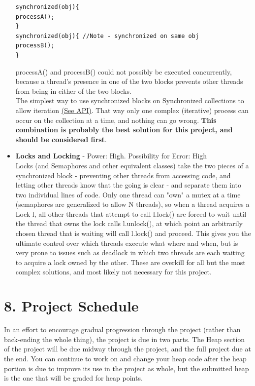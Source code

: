 \documentclass[11pt]{article}
\begin{document}
\begin{itemize}
\begin{lstlisting}[frame=single]
synchronized(obj){
processA();
}
synchronized(obj){ //Note - synchronized on same obj
processB();
}
\end{lstlisting}
processA() and processB() could not possibly be executed concurrently, because a
thread's presence in one of the two blocks prevents other threads from being in
either of the two blocks.\\
The simplest way to use synchronized blocks on Synchronized collections to allow
iteration
\href{http://docs.oracle.com/javase/7/docs/api/java/util/Collections.html\#synchronizedCollection(java.util.Collection)}{({\color{blue}\underline{See
API}})}. That way only one complex (iterative) process can occur on the
collection at a time, and nothing can go wrong. \textbf{This combination is
probably the best solution for this project, and should be considered first}.
\item \textbf{Locks and Locking} - Power: High. Possibility for Error: High\\
Locks (and Semaphores and other equivalent classes) take the two pieces of a
synchronized block - preventing other threads from accessing code, and letting
other threads know that the going is clear - and separate them into two
individual lines of code. Only one thread can "own" a mutex at a time
(semaphores are generalized to allow N threads), so when a thread acquires a
Lock l, all other threads that attempt to call l.lock() are forced to wait until
the thread that owns the lock calls l.unlock(), at which point an arbitrarily
chosen thread that is waiting will call l.lock() and proceed. This gives you the
ultimate control over which threads execute what where and when, but is very
prone to issues such as deadlock in which two threads are each waiting to
acquire a lock owned by the other. These are overkill for all but the most
complex solutions, and most likely not necessary for this project. 
\end{itemize}

\newpage
\section{8. Project Schedule}
In an effort to encourage gradual progression through the project (rather than
back-ending the whole thing), the project is due in two parts. The Heap section
of the project will be due midway through the project, and the full project due
at the end. You can continue to work on and change your heap code after the heap
portion is due to improve its use in the project as whole, but the submitted
heap is the one that will be graded for heap points.
\end{document}
